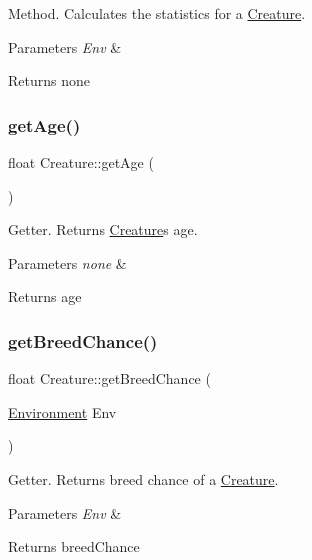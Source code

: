 Method. Calculates the statistics for a \hyperlink{class_creature}{Creature}. 
\begin{DoxyParams}{Parameters}
{\em Env} & \\
\hline
\end{DoxyParams}
\begin{DoxyReturn}{Returns}
none 
\end{DoxyReturn}
\mbox{\label{class_creature_aaa5ecf02e6ec776831d68ee031c3a71a}} 
\subsubsection{\texorpdfstring{get\+Age()}{getAge()}}
{\footnotesize\ttfamily float Creature\+::get\+Age (\begin{DoxyParamCaption}{ }\end{DoxyParamCaption})}

Getter. Returns \hyperlink{class_creature}{Creature}\textquotesingle{}s age. 
\begin{DoxyParams}{Parameters}
{\em none} & \\
\hline
\end{DoxyParams}
\begin{DoxyReturn}{Returns}
age 
\end{DoxyReturn}
\mbox{\label{class_creature_afaa5a16d665af1b106ea974314ed000b}} 
\subsubsection{\texorpdfstring{get\+Breed\+Chance()}{getBreedChance()}}
{\footnotesize\ttfamily float Creature\+::get\+Breed\+Chance (\begin{DoxyParamCaption}\item[{\hyperlink{class_environment}{Environment}}]{Env }\end{DoxyParamCaption})}

Getter. Returns breed chance of a \hyperlink{class_creature}{Creature}. 
\begin{DoxyParams}{Parameters}
{\em Env} & \\
\hline
\end{DoxyParams}
\begin{DoxyReturn}{Returns}
breed\+Chance 
\end{DoxyReturn}
\mbox{\label{class_creature_a9758254f86daca23432c2aa52388b371}} 
